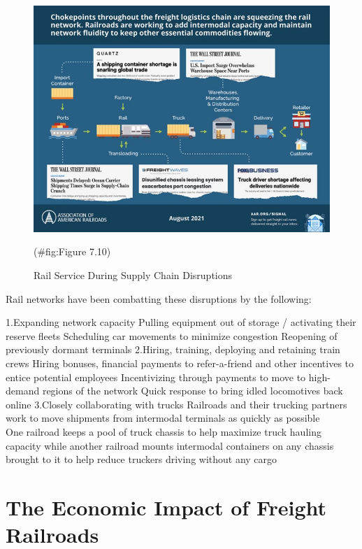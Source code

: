 \documentclass[
]{book}
\begin{document}
\begin{figure}

{\centering \includegraphics{./Images/supplychain/Rail Service During Supply Chain Disruptions} 

}

\caption{Rail Service During Supply Chain Disruptions}(\#fig:Figure 7.10)
\end{figure}

Rail networks have been combatting these disruptions by the following:

1.Expanding network capacity
Pulling equipment out of storage / activating their reserve fleets
Scheduling car movements to minimize congestion
Reopening of previously dormant terminals
2.Hiring, training, deploying and retaining train crews
Hiring bonuses, financial payments to refer-a-friend and other incentives to entice potential employees
Incentivizing through payments to move to high-demand regions of the network
Quick response to bring idled locomotives back online
3.Closely collaborating with trucks
Railroads and their trucking partners work to move shipments from intermodal terminals as quickly as possible\\
One railroad keeps a pool of truck chassis to help maximize truck hauling capacity while another railroad mounts intermodal containers on any chassis brought to it to help reduce truckers driving without any cargo

\hypertarget{SupplyChain-Railportimpact}{%
\section{The Economic Impact of Freight Railroads}\label{SupplyChain-Railportimpact}}
\end{document}
